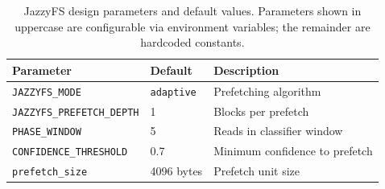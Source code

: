 \documentclass[12pt]{report}
\begin{document}
\begin{table}[H]
\centering
\caption{JazzyFS design parameters and default values. Parameters shown in uppercase are configurable via environment variables; the remainder are hardcoded constants.}
\label{tab:params}
\begin{tabular}{lll}
\toprule
Parameter & Default & Description \\
\midrule
\texttt{JAZZYFS\_MODE}            & \texttt{adaptive} & Prefetching algorithm \\
\texttt{JAZZYFS\_PREFETCH\_DEPTH} & 1                 & Blocks per prefetch \\
\texttt{PHASE\_WINDOW}            & 5                 & Reads in classifier window \\
\texttt{CONFIDENCE\_THRESHOLD}    & 0.7               & Minimum confidence to prefetch \\
\texttt{prefetch\_size}           & 4096 bytes        & Prefetch unit size \\
\bottomrule
\end{tabular}
\end{table}
\end{document}

